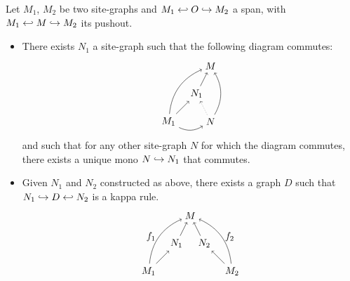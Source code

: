 \begin{lemma}
  \label{lem:inhibit_site}
  Let $M_1$, $M_2$ be two site-graphs and $M_1\hookleftarrow O\hookrightarrow M_2$ a span, with $M_1\hookleftarrow M\hookrightarrow M_2$ its pushout.
  \begin{itemize}
  \item
  There exists $N_1$ a site-graph such that the following diagram commutes:
  \[
  \begin{tikzpicture} %
    \node (m) at (1,2) {\(M\)};
    \node (m1) at (-0.5,0) {\(M_1\)};
    \node (n1) at (0.5,1) {\(N_1\)};
    \node (n) at (1,0) {\(N\)};
    \draw [->] (m1) to [bend left] (m);
    \draw [->] (m1) -- (n1);
    \draw [->] (n1) -- (m);
    \draw [->] (n) to [bend right] (m);
    \draw [->] (m1) to [bend right] (n);
    \draw [dotted,->] (n) -- (n1);
  \end{tikzpicture}
  \]
  and such that for any other site-graph $N$ for which the diagram commutes, there exists a unique mono $N\hookrightarrow N_1$ that commutes.
  \item Given $N_1$ and $N_2$ constructed as above, there exists a graph $D$ such that $N_1\hookrightarrow D\hookleftarrow N_2$ is a kappa rule.
  \[
  \begin{tikzpicture} %
    \node (m) at (1,2) {\(M\)};
    \node (m1) at (-0.5,0) {\(M_1\)};
    \node (n1) at (0.5,1) {\(N_1\)};
    \node (m2) at (2.5,0) {\(M_2\)};
    \node (n2) at (1.5,1) {\(N_2\)};
    \draw [->] (m1) to [bend left] node [left,midway]  {\(f_1\)} (m);
    \draw [->] (m1) -- (n1);
    \draw [->] (n1) -- (m);
    \draw [->] (m2) to [bend right] node [right,midway]  {\(f_2\)} (m);
    \draw [->] (m2) -- (n2);
    \draw [->] (n2) -- (m);
  \end{tikzpicture}
  \]
  \end{itemize}
\end{lemma}
